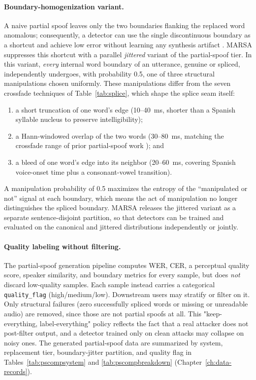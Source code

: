 \documentclass[11pt]{report}
\begin{document}
\paragraph{Boundary-homogenization variant.} A naive
partial spoof leaves only the two boundaries flanking the replaced word
anomalous; consequently, a detector can use the single discontinuous boundary as a
shortcut and achieve low error without learning any synthesis artifact
\citep{negroni2024splicing}. MARSA suppresses this shortcut with a
parallel \emph{jittered} variant of the partial-spoof tier. In this
variant, \emph{every} internal word boundary of an utterance, genuine or
spliced, independently undergoes, with probability 0.5, one of three
structural manipulations chosen uniformly. These manipulations differ
from the seven crossfade techniques of Table~\ref{tab:splice}, which
shape the splice seam itself:
\begin{enumerate}
  \item a short truncation of one word's edge
  (10--\SI{40}{\milli\second}, shorter than a Spanish syllable nucleus
  to preserve intelligibility);
  \item a Hann-windowed overlap of the two words
  (30--\SI{80}{\milli\second}, matching the crossfade range of prior
  partial-spoof work \citep{luong2024llama}); and
  \item a bleed of one word's edge into its neighbor
  (20--\SI{60}{\milli\second}, covering Spanish voice-onset time plus a
  consonant-vowel transition).
\end{enumerate}
A manipulation probability of 0.5 maximizes the entropy of
the ``manipulated or not'' signal at each boundary, which means the act of
manipulation no longer distinguishes the spliced boundary. MARSA releases
the jittered variant as a separate sentence-disjoint partition, so that
detectors can be trained and evaluated on the canonical and jittered
distributions independently or jointly.

\paragraph{Quality labeling without filtering.} The partial-spoof
generation pipeline computes WER, CER, a perceptual quality score,
speaker similarity, and boundary metrics for every sample, but does
\emph{not} discard low-quality samples. Each sample instead carries a
categorical \texttt{quality\_flag} (high/medium/low). Downstream users
may stratify or filter on it. Only structural failures (zero
successfully spliced words or missing or unreadable audio) are removed,
since those are not partial spoofs at all. This "keep-everything,
label-everything" policy reflects the fact that a real attacker does not
post-filter output, and a detector trained only on clean attacks may
collapse on noisy ones. The generated partial-spoof data are summarized
by system, replacement tier, boundary-jitter partition, and quality flag
in Tables~\ref{tab:pscompsystem} and \ref{tab:pscompbreakdown}
(Chapter~\ref{ch:data-records}).
\end{document}
